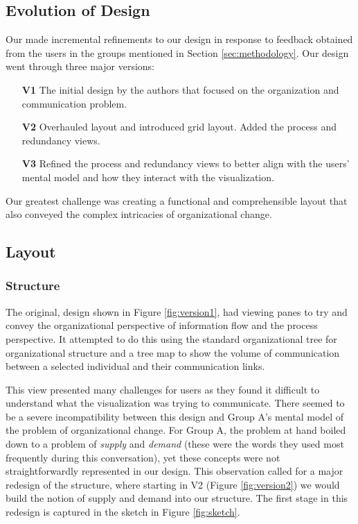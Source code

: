 \documentclass[journal]{vgtc}                %
\begin{document}
\subsection{Evolution of Design}

Our made incremental refinements to our design in response to feedback obtained from the users in the groups mentioned in Section \ref{sec:methodology}. Our design went through three major versions:

\begin{enumerate}
	\item [\textbf{V1}] The initial design by the authors that focused on the organization and communication problem.
	\item [\textbf{V2}] Overhauled layout and introduced grid layout. Added the process and redundancy views.
	\item [\textbf{V3}] Refined the process and redundancy views to better align with the users' mental model and how they interact with the visualization.
\end{enumerate}

Our greatest challenge was creating a functional and comprehensible layout that also conveyed the complex intricacies of organizational change.

\subsection{Layout}
\subsubsection{Structure}
The original, design shown in Figure \ref{fig:version1}, had  viewing panes to try and convey the organizational perspective of information flow and the process perspective.  It attempted to do this using the standard organizational tree for organizational structure and a tree map to show the volume of communication between a selected individual and their communication links.

This view presented many challenges for users as they found it difficult to understand what the visualization was trying to communicate. There seemed to be a severe incompatibility between this design and Group A's mental model of the problem of organizational change. For Group A, the problem at hand boiled down to a problem of \emph{supply} and \emph{demand} (these were the words they used most frequently during this conversation), yet these concepts were not straightforwardly represented in our design. This observation called for a major redesign of the structure, where starting in V2 (Figure \ref{fig:version2}) we would build the notion of supply and demand into our structure. The first stage in this redesign is captured in the sketch in Figure \ref{fig:sketch}.
\end{document}
